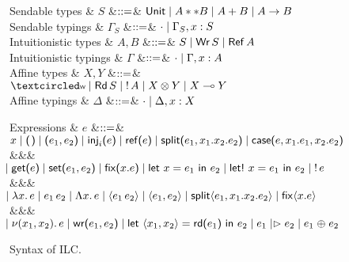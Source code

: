 \begin{figure*}[t]
  \begin{grammar}
    Sendable types
    & $S$
    &$\mathrel{::=}$& $\text{\textsf{Unit}} \mathrel{\mid} {A} ** {B} \mathrel{\mid} {A} + {B} \mathrel{\mid}
    A -> B$
    \\
    Sendable typings
    & ${\Gamma}_S$
    &$\mathrel{::=}$& $\cdot \mathrel{\mid} {\Gamma}_S,x:S$
    \\
    Intuitionistic types
    & $A,B$
    &$\mathrel{::=}$& $S \mathrel{\mid} \text{\textsf{Wr}}\,S \mathrel{\mid} \text{\textsf{Ref}}\,A$
    \\
    Intuitionistic typings
    & $\Gamma$
    &$\mathrel{::=}$& $\cdot \mathrel{\mid} \Gamma,x:A$
    \\
    Affine types
    & $X,Y$
    &$\mathrel{::=}$& $\wrtok \bnfalt \tyRd{S} \bnfalt \tyBang{A} \bnfalt
    \tyTensor{X}{Y} \bnfalt X \multimap Y$
    \\
    Affine typings
    & $\Delta$
    &$\mathrel{::=}$& $\cdot \mathrel{\mid} \Delta,x:X$
  \end{grammar}
  \begin{grammar}
    Expressions
    & $e$
        &$\mathrel{::=}$&
        $\eVar{x} \bnfalt \eUnit \bnfalt \ePair{e_1}{e_2} \bnfalt \eInj{i}{e}
    \bnfalt \eRef{e} \bnfalt \eSplit{e_1}{x_1}{x_2}{e_2} \bnfalt
    \eCase{e}{x_1}{e_1}{x_2}{e_2}$
    \\ &&& $\hspace{-1.02ex}\mathrel{\mid} \text{\textsf{get}}\textsf{(}{e}\textsf{)} \mathrel{\mid} \text{\textsf{set}}\textsf{(}{e_1},{e_2}\textsf{)} \mathrel{\mid} \text{\textsf{fix}}\textsf{(}{x}.{e}\textsf{)}
    \mathrel{\mid} \text{\textsf{let}}\ {x} = {e_1}\ \text{\textsf{in}}\ {e_2} \mathrel{\mid} \text{\textsf{let!}}\ {x} = {e_1}\ \text{\textsf{in}}\ {e_2} \mathrel{\mid} {!}\,{e}$
    \\ &&& $\hspace{-1.02ex}\mathrel{\mid} \lambda{x}.\,{e} \mathrel{\mid} e_1\,e_2 \mathrel{\mid} \Lambda{x}.\,{e}
    \mathrel{\mid} \langle{e_1}\,{e_2}\rangle \mathrel{\mid} \langle{e_1},{e_2}\rangle \mathrel{\mid}
    \text{\textsf{split}}\langle{e_1},{x_1}.{x_2}.{e_2}\rangle \mathrel{\mid} \text{\textsf{fix}}\langle{x}.{e}\rangle$
    \\ &&& $\hspace{-1.02ex}\mathrel{\mid} \nu(x_1,x_2).\,e \mathrel{\mid} \text{\textsf{wr}}\textsf{(}{e_1},{e_2}\textsf{)}
    \mathrel{\mid} \text{\textsf{let}}\ {\langle{x_1},{x_2}\rangle} = {\text{\textsf{rd}}\textsf{(}{e_1}\textsf{)}}\ \text{\textsf{in}}\ {{e_2}} \mathrel{\mid} e_1 \mathrel{|\rhd} e_2 \mathrel{\mid} e_1 \mathrel{\oplus} e_2$
  \end{grammar}
  \caption{Syntax of ILC.}
  \label{fig:ilc-syntax}
\end{figure*}
